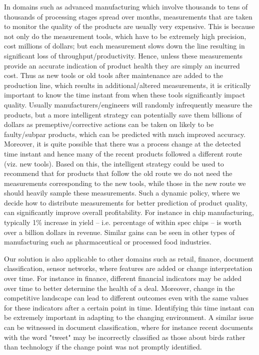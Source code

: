 \documentclass{article}
\begin{document}
In domains such as advanced manufacturing which involve thousands to
tens of thousands of processing stages spread over months, measurements
that are taken to monitor the quality of the products are usually very
expensive. This is because not only do the measurement tools, which
have to be extremely high precision, cost millions of dollars; but
each measurement slows down the line resulting in significant loss of
throughput/productivity. Hence, unless these measurements provide an
accurate indication of product health they are simply an incurred
cost. Thus as new tools or old tools after
maintenance are added to the production line, which results in
additional/altered measurements, it is critically important to know
the time instant from when these tools significantly impact quality.
Usually manufacturers/engineers will randomly infrequently measure the products,
but a more intelligent strategy can potentially save them
billions of dollars as premeptive/corrective actions can be taken on
likely to be faulty/subpar products, which can be predicted with much
improved accuracy. Moreover, it is quite possible that there was a
process change at the detected time instant and hence many of the
recent products followed a different route (viz. new tools). Based on
this, the intelligent strategy could be used to recommend that for
products that follow the old route we do not need the measurements
corresponding to the new tools, while those in the new route we should
heavily sample these measurements. Such a dynamic policy, where we
decide how to distribute measurements for better prediction of product
quality, can significantly improve overall profitability. For instance
in chip manufacturing, typically 1\% increase in yield --
i.e. percentage of within spec chips -- is worth over a billion
dollars in revenue. Similar gains can be seen in other types of
manufacturing such as pharmaceutical or processed food industries.

Our solution is also applicable to other domains such as retail, finance,
document classification, sensor networks, where features are
added or change interpretation over time. For instance in finance,
different financial indicators may be added over time to better
determine the health of a deal. Moreover, change in the competitive
landscape can lead to different outcomes even with the same values for these indicators after a certain point in
time. Identifying this time instant can be extremely important in
adapting to the changing environment. A similar issue can be witnessed in document classification, where for instance recent documents with the word "tweet" may be incorrectly classified as those about birds rather than technology if the change point was not promptly identified.
\end{document}
